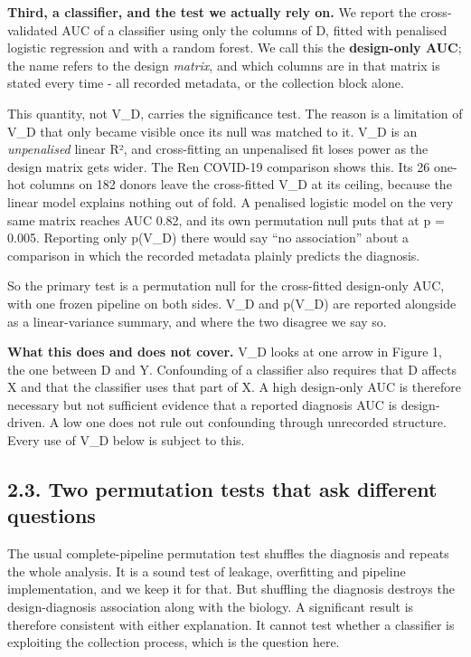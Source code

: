 \textbf{Third, a classifier, and the test we actually rely on.} We report the cross-validated AUC of a classifier using only the columns of D, fitted with penalised logistic regression and with a random forest. We call this the \textbf{design-only AUC}; the name refers to the design \emph{matrix}, and which columns are in that matrix is stated every time - all recorded metadata, or the collection block alone.

This quantity, not V\_D, carries the significance test. The reason is a limitation of V\_D that only became visible once its null was matched to it. V\_D is an \emph{unpenalised} linear R², and cross-fitting an unpenalised fit loses power as the design matrix gets wider. The Ren COVID-19 comparison shows this. Its 26 one-hot columns on 182 donors leave the cross-fitted V\_D at its ceiling, because the linear model explains nothing out of fold. A penalised logistic model on the very same matrix reaches AUC 0.82, and its own permutation null puts that at p = 0.005. Reporting only p(V\_D) there would say ``no association'' about a comparison in which the recorded metadata plainly predicts the diagnosis.

So the primary test is a permutation null for the cross-fitted design-only AUC, with one frozen pipeline on both sides. V\_D and p(V\_D) are reported alongside as a linear-variance summary, and where the two disagree we say so.

\textbf{What this does and does not cover.} V\_D looks at one arrow in Figure 1, the one between D and Y. Confounding of a classifier also requires that D affects X and that the classifier uses that part of X. A high design-only AUC is therefore necessary but not sufficient evidence that a reported diagnosis AUC is design-driven. A low one does not rule out confounding through unrecorded structure. Every use of V\_D below is subject to this.

\subsection{2.3. Two permutation tests that ask different questions}\label{two-permutation-tests-that-ask-different-questions}

The usual complete-pipeline permutation test shuffles the diagnosis and repeats the whole analysis. It is a sound test of leakage, overfitting and pipeline implementation, and we keep it for that. But shuffling the diagnosis destroys the design-diagnosis association along with the biology. A significant result is therefore consistent with either explanation. It cannot test whether a classifier is exploiting the collection process, which is the question here.

